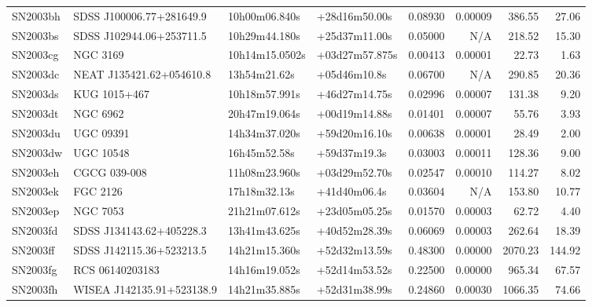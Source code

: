 \begin{longtable}{llllrrrr}
SN2003bh         &        SDSS J100006.77+281649.9 &   10h00m06.840s &   +28d16m50.00s &  0.08930 &  0.00009 &   386.55 &       27.06 \\
SN2003bs         &        SDSS J102944.06+253711.5 &   10h29m44.180s &   +25d37m11.00s &  0.05000 &      N/A &   218.52 &       15.30 \\
SN2003cg         &                        NGC 3169 &  10h14m15.0502s &  +03d27m57.875s &  0.00413 &  0.00001 &    22.73 &        1.63 \\
SN2003dc         &        NEAT J135421.62+054610.8 &    13h54m21.62s &    +05d46m10.8s &  0.06700 &      N/A &   290.85 &       20.36 \\
SN2003ds         &                    KUG 1015+467 &   10h18m57.991s &   +46d27m14.75s &  0.02996 &  0.00007 &   131.38 &        9.20 \\
SN2003dt         &                        NGC 6962 &   20h47m19.064s &   +00d19m14.88s &  0.01401 &  0.00007 &    55.76 &        3.93 \\
SN2003du         &                       UGC 09391 &   14h34m37.020s &   +59d20m16.10s &  0.00638 &  0.00001 &    28.49 &        2.00 \\
SN2003dw         &                       UGC 10548 &    16h45m52.58s &    +59d37m19.3s &  0.03003 &  0.00011 &   128.36 &        9.00 \\
SN2003eh         &                    CGCG 039-008 &   11h08m23.960s &   +03d29m52.70s &  0.02547 &  0.00010 &   114.27 &        8.02 \\
SN2003ek         &                        FGC 2126 &    17h18m32.13s &    +41d40m06.4s &  0.03604 &      N/A &   153.80 &       10.77 \\
SN2003ep         &                        NGC 7053 &   21h21m07.612s &   +23d05m05.25s &  0.01570 &  0.00003 &    62.72 &        4.40 \\
SN2003fd         &        SDSS J134143.62+405228.3 &   13h41m43.625s &   +40d52m28.39s &  0.06069 &  0.00003 &   262.64 &       18.39 \\
SN2003ff         &        SDSS J142115.36+523213.5 &   14h21m15.360s &   +52d32m13.59s &  0.48300 &  0.00000 &  2070.23 &      144.92 \\
SN2003fg         &                 RCS 06140203183 &   14h16m19.052s &   +52d14m53.52s &  0.22500 &  0.00000 &   965.34 &       67.57 \\
SN2003fh         &       WISEA J142135.91+523138.9 &   14h21m35.885s &   +52d31m38.99s &  0.24860 &  0.00030 &  1066.35 &       74.66 \\

\end{longtable}
